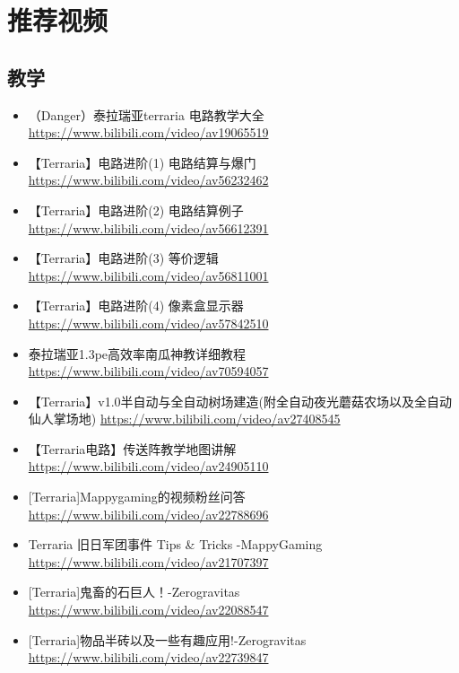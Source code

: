 \chapter{推荐视频}
\section{教学}
\begin{itemize}
\item （Danger）泰拉瑞亚terraria 电路教学大全 \url{https://www.bilibili.com/video/av19065519}
\item 【Terraria】电路进阶(1) 电路结算与爆门 \url{https://www.bilibili.com/video/av56232462}
\item 【Terraria】电路进阶(2) 电路结算例子 \url{https://www.bilibili.com/video/av56612391}
\item 【Terraria】电路进阶(3) 等价逻辑 \url{https://www.bilibili.com/video/av56811001}
\item 【Terraria】电路进阶(4) 像素盒显示器 \url{https://www.bilibili.com/video/av57842510}
\item 泰拉瑞亚1.3pe高效率南瓜神教详细教程 \url{https://www.bilibili.com/video/av70594057}
\item 【Terraria】v1.0半自动与全自动树场建造(附全自动夜光蘑菇农场以及全自动仙人掌场地) \url{https://www.bilibili.com/video/av27408545}
\item 【Terraria电路】传送阵教学地图讲解 \url{https://www.bilibili.com/video/av24905110}
\item {[}Terraria]Mappygaming的视频粉丝问答 \url{https://www.bilibili.com/video/av22788696}
\item Terraria 旧日军团事件 Tips \& Tricks -MappyGaming \url{https://www.bilibili.com/video/av21707397}
\item {[}Terraria]鬼畜的石巨人！-Zerogravitas \url{https://www.bilibili.com/video/av22088547}
\item {[}Terraria]物品半砖以及一些有趣应用!-Zerogravitas \url{https://www.bilibili.com/video/av22739847}
\end{itemize}

